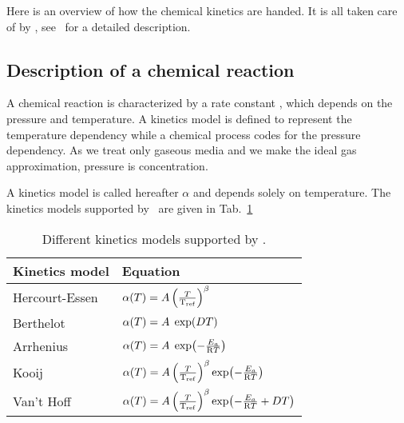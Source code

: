 Here is an overview of how the chemical kinetics are
handed. It is all taken
care of by \Antioch, see \GitAntioch\ for a detailed
description.

\subsection{Description of a chemical reaction}

A chemical reaction is characterized by a rate constant
\rate, which depends on the pressure and temperature.
A kinetics model is defined to represent the temperature
dependency while a chemical process codes for the pressure
dependency. As we treat only gaseous media and we make
the ideal gas approximation, pressure is concentration.

A kinetics model is called hereafter $\alpha$ and depends solely on
temperature. The kinetics models supported by \Antioch\ are given
in Tab.~\ref{Antioch_kinetics_models}
\begin{table}
\centering
\renewcommand{\arraystretch}{2}
\begin{tabular}{ll}\toprule
Kinetics model & Equation \\\midrule
Hercourt-Essen & $\alpha(T) = A \left(\frac{T}{\mathrm{T_{ref}}}\right)^{\beta}$ \\
Berthelot      & $\alpha(T) = A \;\exp\!\left(D T\right)$ \\
Arrhenius      & $\alpha(T) = A \;\exp\!\left(-\frac{E_a}{\mathrm{R} T}\right)$ \\
Kooij          & $\alpha(T) = A \left(\frac{T}{\mathrm{T_{ref}}}\right)^{\beta}\exp\!\left(-\frac{E_a}{\mathrm{R} T}\right)$ \\
Van't Hoff     & $\alpha(T) = A \left(\frac{T}{\mathrm{T_{ref}}}\right)^{\beta}\exp\!\left(-\frac{E_a}{\mathrm{R} T} + D T\right)$ \\
\bottomrule
\end{tabular}
\caption{\label{Antioch_kinetics_models}Different kinetics models supported by \Antioch.}
\end{table}

